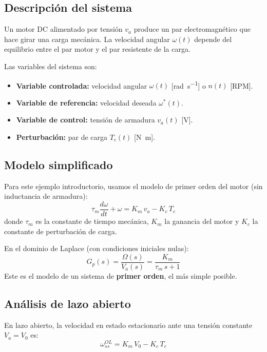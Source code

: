 \subsection{Descripción del sistema}

Un motor DC alimentado por tensión $v_a$ produce un par electromagnético
que hace girar una carga mecánica. La velocidad angular $\omega(t)$ depende
del equilibrio entre el par motor y el par resistente de la carga.

Las variables del sistema son:
\begin{itemize}
  \item \textbf{Variable controlada:} velocidad angular $\omega(t)$
    [\si{\radian\per\second}] o $n(t)$ [RPM].
  \item \textbf{Variable de referencia:} velocidad deseada $\omega^*(t)$.
  \item \textbf{Variable de control:} tensión de armadura $v_a(t)$ [\si{\volt}].
  \item \textbf{Perturbación:} par de carga $T_c(t)$ [\si{\newton\meter}].
\end{itemize}

\subsection{Modelo simplificado}

Para este ejemplo introductorio, usamos el modelo de primer orden del motor
(sin inductancia de armadura):
\begin{equation}
  \tau_m \frac{d\omega}{dt} + \omega = K_m\,v_a - K_c\,T_c
  \label{eq:motor-dc}
\end{equation}
donde $\tau_m$ es la constante de tiempo mecánica, $K_m$ la ganancia del
motor y $K_c$ la constante de perturbación de carga.

En el dominio de Laplace (con condiciones iniciales nulas):
\begin{equation}
  G_p(s) = \frac{\Omega(s)}{V_a(s)} = \frac{K_m}{\tau_m\,s + 1}
  \label{eq:ft-motor}
\end{equation}
Este es el modelo de un sistema de \textbf{primer orden}, el más simple posible.

\subsection{Análisis de lazo abierto}

En lazo abierto, la velocidad en estado estacionario ante una tensión
constante $V_a = V_0$ es:
\begin{equation}
  \omega_{ss}^{OL} = K_m\,V_0 - K_c\,T_c
  \label{eq:motor-oa}
\end{equation}


